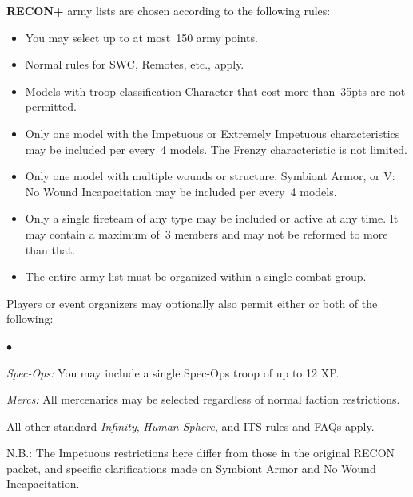 \documentclass[14pt,dvipsnames]{extarticle}
\newenvironment{squishitemize}
{\begin{list}{$\bullet$}{%
    \setlength{\itemsep}{2pt}%
    \setlength{\parsep}{2pt}%
    \setlength{\topsep}{2pt}%
    \setlength{\parskip}{0pt} %
    \renewcommand{\labelitemi}{--}}}
  {\end{list}}
\newcommand{\reconplus}{\textbf{RECON+}\xspace}
\begin{document}
\reconplus army lists are chosen according to the following rules:

\vspace{-1em}
\begin{itemize}
\item You may select up to at most~150 army points.
\item Normal rules for SWC, Remotes, etc., apply.
\item Models with troop classification Character that cost more
  than~35pts are not permitted.
\item Only one model with the Impetuous or Extremely Impetuous
  characteristics may be included per every~4 models.  The Frenzy
  characteristic is not limited.

\item Only one model with multiple wounds or structure, Symbiont
  Armor, or V: No Wound Incapacitation may be included per every~4
  models.
  
\item Only a single fireteam of any type may be included or active at
  any time.  It may contain a maximum of~3 members and may not be
  reformed to more than that.
\item The entire army list must be organized within a single combat
  group.
\end{itemize}

Players or event organizers may optionally also permit either or both
of the following:

\begin{squishitemize}
\item \emph{Spec-Ops:} You may include a single Spec-Ops troop of up to 12 XP.
\item \emph{Mercs:} All mercenaries may be selected regardless of normal
  faction restrictions.
\end{squishitemize}

All other standard \emph{Infinity}, \emph{Human Sphere}, and ITS rules
and FAQs apply.

\begin{recon}
  N.B.: The Impetuous restrictions here differ from those in the
  original RECON packet, and specific clarifications made on Symbiont
  Armor and No Wound Incapacitation.
\end{recon}
\end{document}
